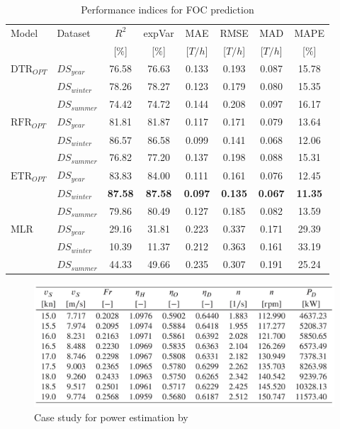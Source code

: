 \begin{table}[h]
    \footnotesize
    \centering
    {\begin{tabular}{ l l c c c c c c }
    \hline
    Model & Dataset & $R^2$ & expVar & MAE & RMSE & MAD & MAPE \\
    & & [$\%$] & [$\%$] & [$T/h$] & [$T/h$] & [$T/h$] & [$\%$]  \\ 
    \hline
    $\text{DTR}_{OPT}$ & $DS_{year}$ & 76.58 & 76.63 & 0.133 & 0.193  & 0.087 & 15.78  \\
    & $DS_{winter}$ & 78.26 & 78.27 & 0.123 & 0.179 & 0.080 & 15.35 \\
    & $DS_{summer}$ & 74.42 & 74.72 & 0.144 &  0.208 & 0.097 & 16.17 \\
    $\text{RFR}_{OPT}$ & $DS_{year}$  & 81.81 & 81.87 & 0.117 & 0.171 & 0.079 & 13.64 \\
    & $DS_{winter}$ & 86.57 & 86.58 & 0.099 & 0.141 & 0.068 & 12.06 \\
    & $DS_{summer}$ & 76.82 & 77.20 & 0.137 & 0.198 & 0.088 & 15.31 \\
    $\text{ETR}_{OPT}$ & $DS_{year}$ & 83.83 & 84.00 & 0.111 & 0.161 & 0.076 & 12.45\\
    & $DS_{winter}$ & \textbf{87.58} & \textbf{87.58} & \textbf{0.097} & \textbf{0.135} & \textbf{0.067} & \textbf{11.35} \\
    & $DS_{summer}$ & 79.86 & 80.49 & 0.127 & 0.185 & 0.082 & 13.59 \\
    MLR & $DS_{year}$ & 29.16 & 31.81 & 0.223 & 0.337 & 0.171 & 29.39 \\
    & $DS_{winter}$ & 10.39 & 11.37 & 0.212 & 0.363 &0.161& 33.19 \\
    & $DS_{summer}$ & 44.33 & 49.66 & 0.235 & 0.307 & 0.191 & 25.24 \\
    \hline
    \end{tabular}}
\caption{Performance indices for FOC prediction}\label{tbl:FOC_scores_errors}
\end{table}

\begin{figure}[ht]
    \centering
    \includegraphics[width=.8\linewidth]{02_figures/birk19_Pb_nonlinear_case.jpg}
    \caption{Case study for power estimation by }
    \label{fig:birk19_Pb_nonlinear}
\end{figure}

